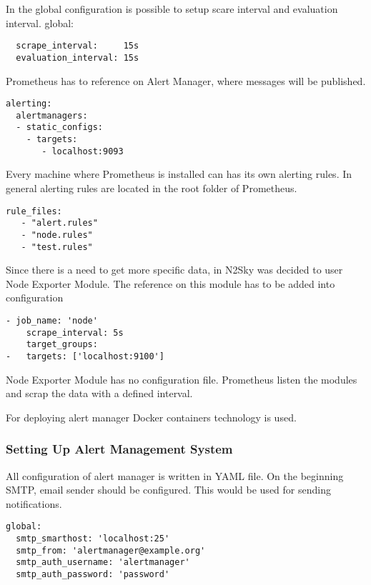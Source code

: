  In the global configuration is possible to setup scare interval and evaluation interval.
global:
 
 \begin{lstlisting}
  scrape_interval:     15s 
  evaluation_interval: 15s 
\end{lstlisting}

Prometheus has to reference on Alert Manager, where messages will be published. 
 \begin{lstlisting}
alerting:
  alertmanagers:
  - static_configs:
    - targets:
       - localhost:9093
\end{lstlisting}

Every machine where Prometheus is installed can has its own alerting rules. In general alerting rules are located in the root folder of Prometheus.

 \begin{lstlisting}
rule_files:
   - "alert.rules"
   - "node.rules"
   - "test.rules"
\end{lstlisting}

Since there is a need to get more specific data, in N2Sky was decided to user Node Exporter Module. The reference on this module has to be added into configuration

 \begin{lstlisting}
- job_name: 'node'
    scrape_interval: 5s
    target_groups:
-	targets: ['localhost:9100']
\end{lstlisting}

Node Exporter Module has no configuration file. Prometheus listen the modules and scrap the data with a defined interval.

For deploying alert manager Docker containers technology is used.

\subsubsection{Setting Up Alert Management System}\label{Setting up Alert Management System}

All configuration of alert manager is written in YAML file. 
On the beginning SMTP, email sender should be configured. This would be used for sending notifications.

 \begin{lstlisting}
global:
  smtp_smarthost: 'localhost:25'
  smtp_from: 'alertmanager@example.org'
  smtp_auth_username: 'alertmanager'
  smtp_auth_password: 'password'
\end{lstlisting}

